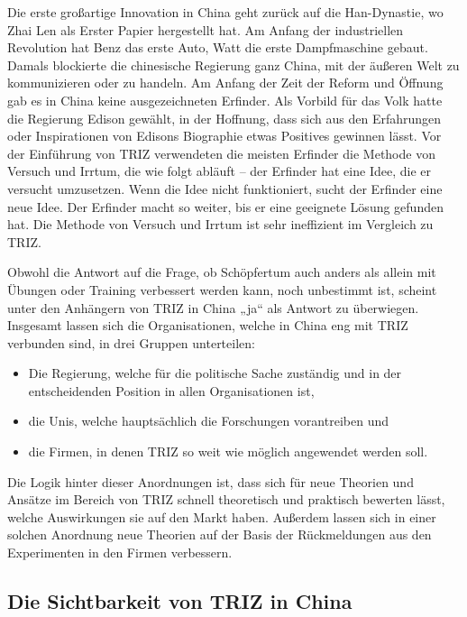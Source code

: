\documentclass[11pt,a4paper]{article}
\begin{document}
Die erste großartige Innovation in China geht zurück auf die Han-Dynastie, wo
Zhai Len als Erster Papier hergestellt hat. Am Anfang der industriellen
Revolution hat Benz das erste Auto, Watt die erste Dampfmaschine gebaut.
Damals blockierte die chinesische Regierung ganz China, mit der äußeren Welt
zu kommunizieren oder zu handeln. Am Anfang der Zeit der Reform und Öffnung
gab es in China keine ausgezeichneten Erfinder. Als Vorbild für das Volk hatte
die Regierung Edison gewählt, in der Hoffnung, dass sich aus den Erfahrungen
oder Inspirationen von Edisons Biographie etwas Positives gewinnen lässt. Vor
der Einführung von TRIZ verwendeten die meisten Erfinder die Methode von
Versuch und Irrtum, die wie folgt abläuft -- der Erfinder hat eine Idee, die
er versucht umzusetzen. Wenn die Idee nicht funktioniert, sucht der Erfinder
eine neue Idee. Der Erfinder macht so weiter, bis er eine geeignete Lösung
gefunden hat. Die Methode von Versuch und Irrtum ist sehr ineffizient im
Vergleich zu TRIZ.

Obwohl die Antwort auf die Frage, ob Schöpfertum auch anders als allein mit
Übungen oder Training verbessert werden kann, noch unbestimmt ist, scheint
unter den Anhängern von TRIZ in China „ja“ als Antwort zu überwiegen.
Insgesamt lassen sich die Organisationen, welche in China eng mit TRIZ
verbunden sind, in drei Gruppen unterteilen:
\begin{itemize}
\item Die Regierung, welche für die politische Sache zuständig und in der
  entscheidenden Position in allen Organisationen ist,
\item die Unis, welche hauptsächlich die Forschungen vorantreiben und
\item die Firmen, in denen TRIZ so weit wie möglich angewendet werden soll.
\end{itemize}
Die Logik hinter dieser Anordnungen ist, dass sich für neue Theorien und
Ansätze im Bereich von TRIZ schnell theoretisch und praktisch bewerten lässt,
welche Auswirkungen sie auf den Markt haben. Außerdem lassen sich in einer
solchen Anordnung neue Theorien auf der Basis der Rückmeldungen aus den
Experimenten in den Firmen verbessern.

\subsection{Die Sichtbarkeit von TRIZ in China}
\end{document}
